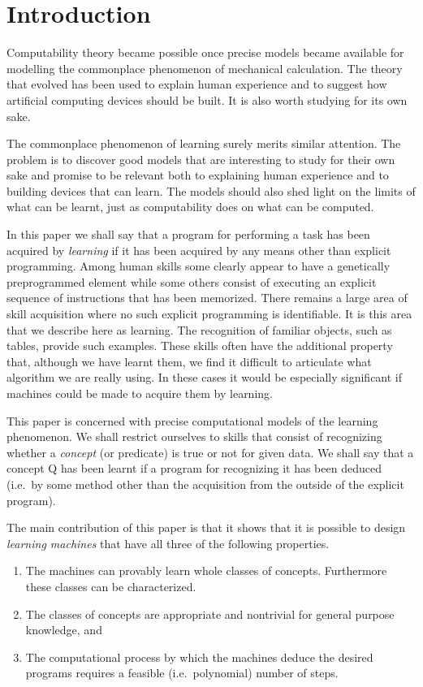 \section{Introduction}

Computability theory became possible once
precise models became available for modelling the
commonplace phenomenon of mechanical calculation.
The theory that evolved has been used to explain
human experience and to suggest how artificial
computing devices should be built.  It is also
worth studying for its own sake.

The commonplace phenomenon of learning surely
merits similar attention.  The problem is to discover good models that are interesting to study
for their own sake and promise to be relevant both
to explaining human experience and to building
devices that can learn.  The models should also
shed light on the limits of what can be learnt,
just as computability does on what can be computed.

In this paper we shall say that a program for
performing a task has been acquired by \emph{learning} if
it has been acquired by any means other than
explicit programming.  Among human skills some
clearly appear to have a genetically preprogrammed
element while some others consist of executing an
explicit sequence of instructions that has been
memorized.  There remains a large area of skill
acquisition where no such explicit programming is
identifiable.  It is this area that we describe
here as learning.  The recognition of familiar
objects, such as tables, provide such examples.
These skills often have the additional property
that, although we have learnt them, we find it
difficult to articulate what algorithm we are
really using.  In these cases it would be especially significant if machines could be made to
acquire them by learning.

This paper is concerned with precise computational models of the learning phenomenon.  We shall
restrict ourselves to skills that consist of recognizing whether a \emph{concept} (or predicate) is true
or not for given data.  We shall say that a concept Q has been learnt if a program for recognizing it has been deduced (i.e.\ by some method
other than the acquisition from the outside of the
explicit program).

The main contribution of this paper is that it
shows that it is possible to design \emph{learning
machines} that have all three of the following properties.

\begin{enumerate}
\item[(A)] The machines can provably learn whole
classes of concepts.  Furthermore these classes can
be characterized.

\item[(B)] The classes of concepts are appropriate
and nontrivial for general purpose knowledge, and

\item[(C)] The computational process by which the
machines deduce the desired programs requires a
feasible (i.e.\ polynomial) number of steps.
\end{enumerate}

